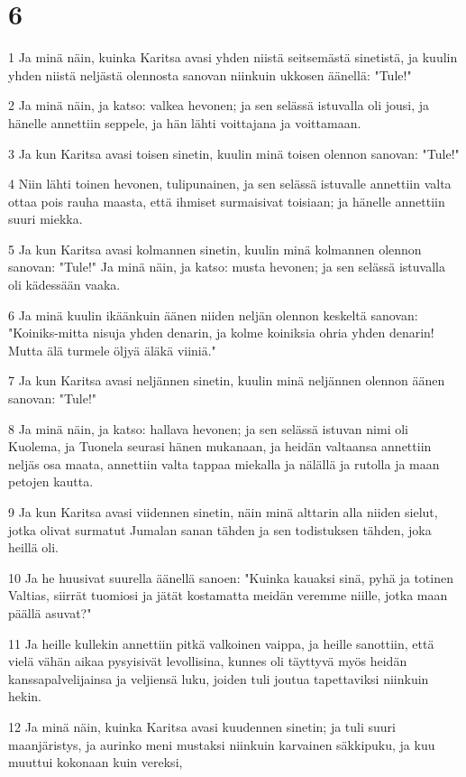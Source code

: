 \chapter{6}

\par 1 Ja minä näin, kuinka Karitsa avasi yhden niistä seitsemästä sinetistä, ja kuulin yhden niistä neljästä olennosta sanovan niinkuin ukkosen äänellä: "Tule!"
\par 2 Ja minä näin, ja katso: valkea hevonen; ja sen selässä istuvalla oli jousi, ja hänelle annettiin seppele, ja hän lähti voittajana ja voittamaan.
\par 3 Ja kun Karitsa avasi toisen sinetin, kuulin minä toisen olennon sanovan: "Tule!"
\par 4 Niin lähti toinen hevonen, tulipunainen, ja sen selässä istuvalle annettiin valta ottaa pois rauha maasta, että ihmiset surmaisivat toisiaan; ja hänelle annettiin suuri miekka.
\par 5 Ja kun Karitsa avasi kolmannen sinetin, kuulin minä kolmannen olennon sanovan: "Tule!" Ja minä näin, ja katso: musta hevonen; ja sen selässä istuvalla oli kädessään vaaka.
\par 6 Ja minä kuulin ikäänkuin äänen niiden neljän olennon keskeltä sanovan: "Koiniks-mitta nisuja yhden denarin, ja kolme koiniksia ohria yhden denarin! Mutta älä turmele öljyä äläkä viiniä."
\par 7 Ja kun Karitsa avasi neljännen sinetin, kuulin minä neljännen olennon äänen sanovan: "Tule!"
\par 8 Ja minä näin, ja katso: hallava hevonen; ja sen selässä istuvan nimi oli Kuolema, ja Tuonela seurasi hänen mukanaan, ja heidän valtaansa annettiin neljäs osa maata, annettiin valta tappaa miekalla ja nälällä ja rutolla ja maan petojen kautta.
\par 9 Ja kun Karitsa avasi viidennen sinetin, näin minä alttarin alla niiden sielut, jotka olivat surmatut Jumalan sanan tähden ja sen todistuksen tähden, joka heillä oli.
\par 10 Ja he huusivat suurella äänellä sanoen: "Kuinka kauaksi sinä, pyhä ja totinen Valtias, siirrät tuomiosi ja jätät kostamatta meidän veremme niille, jotka maan päällä asuvat?"
\par 11 Ja heille kullekin annettiin pitkä valkoinen vaippa, ja heille sanottiin, että vielä vähän aikaa pysyisivät levollisina, kunnes oli täyttyvä myös heidän kanssapalvelijainsa ja veljiensä luku, joiden tuli joutua tapettaviksi niinkuin hekin.
\par 12 Ja minä näin, kuinka Karitsa avasi kuudennen sinetin; ja tuli suuri maanjäristys, ja aurinko meni mustaksi niinkuin karvainen säkkipuku, ja kuu muuttui kokonaan kuin vereksi,
